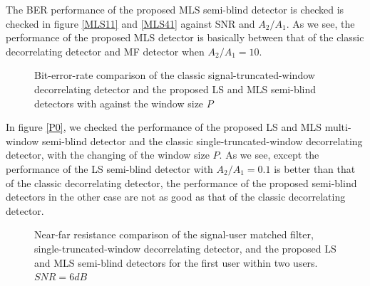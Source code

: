 \documentclass[a4paper,11pt,fleqn]{article}
\begin{document}
The BER performance of the proposed MLS semi-blind detector is
checked is checked in figure \ref{MLS11} and \ref{MLS41} against
SNR and $A_2/A_1$. As we see, the performance of the proposed MLS
detector is basically between that of the classic decorrelating
detector and MF detector when $A_2/A_1=10$.

\begin{figure}
\caption{Bit-error-rate comparison of the classic
signal-truncated-window decorrelating detector and the proposed LS
and MLS semi-blind detectors with against the window size $P$}
\label{P1}
\end{figure}

In figure \ref{P0}, we checked the performance of the proposed LS
and MLS multi-window semi-blind detector and the classic
single-truncated-window decorrelating detector, with the changing
of the window size $P$. As we see, except the performance of the
LS semi-blind detector with $A_2/A_1=0.1$ is better than that of
the classic decorrelating detector, the performance of the
proposed semi-blind detectors in the other case are not as good as
that of the classic decorrelating detector.

\begin{figure}
\caption{Near-far resistance comparison of the signal-user matched
filter, single-truncated-window decorrelating detector, and the
proposed LS and MLS semi-blind detectors for the first user within
two users. $SNR=6dB$} \label{NFR1}
\end{figure}
\end{document}

